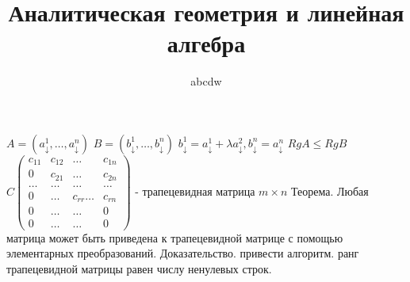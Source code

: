 \documentclass[12pt]{article}
\title{Аналитическая геометрия и линейная алгебра}
\date{}
\author{abcdw}
\begin{document}
    \maketitle
    $A = (a_{\downarrow}^1, \dots, a_{\downarrow}^n)$ \newline
    $B = (b_{\downarrow}^1, \dots, b_{\downarrow}^n)$ \newline
    $b_{\downarrow}^1 = a_{\downarrow}^1+ \lambda a_{\downarrow}^2, b_{\downarrow}^n = a_{\downarrow}^n$ \newline
    $Rg A \leq Rg B$ \newline
    $C \begin{pmatrix}
        c_{11} & c_{12} & \dots & c_{1n} \\
        0 & c_{21} & \dots & c_{2n} \\  
        \dots & \dots & \dots & \dots \\
        0 & \dots & c_{rr} \dots & c_{rn} \\
        0 & \dots & \dots & 0 \\
        0 & \dots & \dots & 0 
    \end{pmatrix}$ - трапецевидная матрица $m \times n$ \newline
    Теорема. Любая матрица может быть приведена к трапецевидной матрице с помощью элементарных преобразований. \newline
    Доказательство. привести алгоритм. \newline
    ранг трапецевидной матрицы равен числу ненулевых строк. \newline
\end{document}
